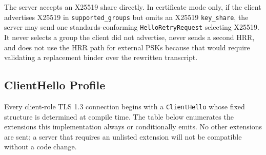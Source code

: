 \documentclass[titlepage]{report}
\begin{document}
	The server accepts an X25519 share directly. In certificate mode only, if the client advertises X25519 in \texttt{supported\_groups} but omits an X25519 \texttt{key\_share}, the server may send one standards-conforming \texttt{HelloRetryRequest} selecting X25519. It never selects a group the client did not advertise, never sends a second HRR, and does not use the HRR path for external PSKs because that would require validating a replacement binder over the rewritten transcript.

	\subsection{ClientHello Profile}
	\label{ssec:clienthello_profile}

	Every client-role TLS 1.3 connection begins with a \texttt{ClientHello} whose fixed structure is determined at compile time. The table below enumerates the extensions this implementation always or conditionally emits. No other extensions are sent; a server that requires an unlisted extension will not be compatible without a code change.
\end{document}
